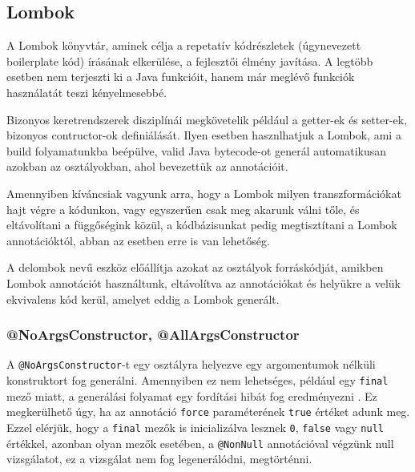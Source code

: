 \subsection{Lombok}

A Lombok könyvtár, aminek célja a repetatív kódrészletek (úgynevezett boilerplate kód) írásának elkerülése, a fejlesztői élmény javítása. A legtöbb esetben nem terjeszti ki a Java funkcióit, hanem már meglévő funkciók használatát teszi kényelmesebbé. \par

Bizonyos keretrendszerek disziplínái megkövetelik például a getter-ek és setter-ek, bizonyos contructor-ok definiálását. Ilyen esetben hasznlhatjuk a Lombok, ami a build folyamatunkba beépülve, valid Java bytecode-ot generál automatikusan azokban az osztályokban, ahol bevezettük az annotációit.\par

Amennyiben kíváncsiak vagyunk arra, hogy a Lombok milyen transzformációkat hajt végre a kódunkon, vagy egyszerűen csak meg akarunk válni tőle, és eltávolítani a függőségink közül, a kódbázisunkat pedig megtisztítani a Lombok annotációktól, abban az esetben erre is van lehetőség. \par

A delombok nevű eszköz előállítja azokat az osztályok forráskódját, amikben Lombok annotációt használtunk, eltávolítva az annotációkat és helyükre a velük ekvivalens kód kerül, amelyet eddig a Lombok generált. \par


\subsubsection{@NoArgsConstructor, @AllArgsConstructor}

A \lstinline|@NoArgsConstructor|-t egy osztályra helyezve egy argomentumok nélküli konstruktort fog generálni. Amennyiben ez nem lehetséges, például egy \lstinline|final| mező miatt, a generálási folyamat egy fordítási hibát fog eredményezni \cite{lombokConstructorDocumentation}. Ez megkerülhető úgy, ha az annotáció \lstinline|force| paraméterének \lstinline|true| értéket adunk meg. Ezzel elérjük, hogy a \lstinline|final| mezők is inicializálva lesznek \lstinline|0|, \lstinline|false| vagy \lstinline|null| értékkel, azonban olyan mezők esetében, a \lstinline|@NonNull| annotációval végzünk null vizsgálatot, ez a vizsgálat nem fog legenerálódni, megtörténni. \par

